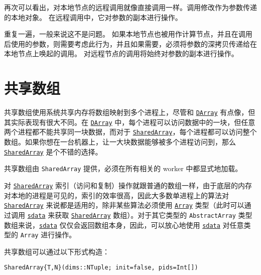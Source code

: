再次可以看出，对本地节点的远程调用就像直接调用一样。调用修改作为参数传递的本地对象。 在远程调用中，它对参数的副本进行操作。



重复一遍，一般来说这不是问题。 如果本地节点也被用作计算节点，并且在调用后使用的参数，则需要考虑此行为，并且如果需要，必须将参数的深拷贝传递给在本地节点上唤起的调用。 对远程节点的调用将始终对参数的副本进行操作。



\hypertarget{16489506716059563786}{}


\section{共享数组}



共享数组使用系统共享内存将数组映射到多个进程上，尽管和 \href{https://github.com/JuliaParallel/DistributedArrays.jl}{\texttt{DArray}} 有点像，但其实际表现有很大不同。在 \href{https://github.com/JuliaParallel/DistributedArrays.jl}{\texttt{DArray}} 中，每个进程可以访问数据中的一块，但任意两个进程都不能共享同一块数据，而对于 \hyperlink{15069300442338861576}{\texttt{SharedArray}}，每个进程都可以访问整个数组。如果你想在一台机器上，让一大块数据能够被多个进程访问到，那么 \hyperlink{15069300442338861576}{\texttt{SharedArray}} 是个不错的选择。



共享数组由 \texttt{SharedArray} 提供，必须在所有相关的 worker 中都显式地加载。



对 \hyperlink{15069300442338861576}{\texttt{SharedArray}} 索引（访问和复制）操作就跟普通的数组一样，由于底层的内存对本地的进程是可见的，索引的效率很高，因此大多数单进程上的算法对 \hyperlink{15069300442338861576}{\texttt{SharedArray}} 来说都是适用的，除非某些算法必须使用 \hyperlink{15492651498431872487}{\texttt{Array}} 类型（此时可以通过调用 \hyperlink{5828642841105091437}{\texttt{sdata}} 来获取 \hyperlink{15069300442338861576}{\texttt{SharedArray}} 数组）。对于其它类型的 \texttt{AbstractArray} 类型数组来说，\hyperlink{5828642841105091437}{\texttt{sdata}} 仅仅会返回数组本身，因此，可以放心地使用 \hyperlink{5828642841105091437}{\texttt{sdata}} 对任意类型的 \texttt{Array} 进行操作。



共享数组可以通过以下形式构造：




\begin{verbatim}
SharedArray{T,N}(dims::NTuple; init=false, pids=Int[])
\end{verbatim}



